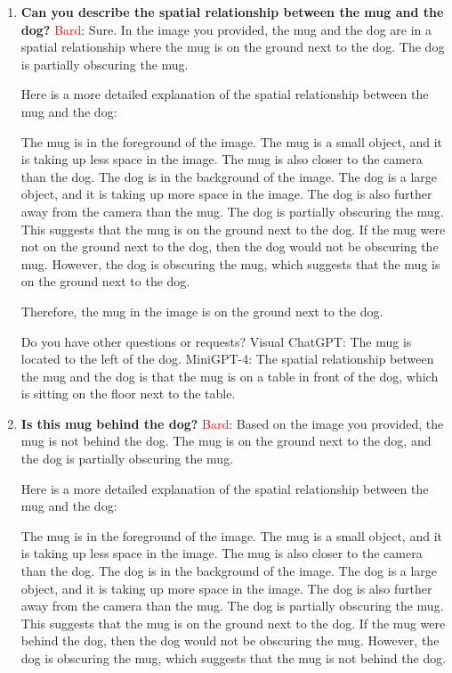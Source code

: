 \begin{enumerate}
    \item \textbf{Can you describe the spatial relationship between the mug and the dog?}
    \subitem \textcolor{Red}{Bard}: 
    Sure. In the image you provided, the mug and the dog are in a spatial relationship where the mug is on the ground next to the dog. The dog is partially obscuring the mug.
    
    Here is a more detailed explanation of the spatial relationship between the mug and the dog:
    
    The mug is in the foreground of the image. The mug is a small object, and it is taking up less space in the image. The mug is also closer to the camera than the dog.
    The dog is in the background of the image. The dog is a large object, and it is taking up more space in the image. The dog is also further away from the camera than the mug.
    The dog is partially obscuring the mug. This suggests that the mug is on the ground next to the dog.
    If the mug were not on the ground next to the dog, then the dog would not be obscuring the mug. However, the dog is obscuring the mug, which suggests that the mug is on the ground next to the dog.
    
    Therefore, the mug in the image is on the ground next to the dog.
    
    Do you have other questions or requests?
    \subitem Visual ChatGPT: The mug is located to the left of the dog.
    \subitem MiniGPT-4: The spatial relationship between the mug and the dog is that the mug is on a table in front of the dog, which is sitting on the floor next to the table.
    \item \textbf{Is this mug behind the dog?}
    \subitem \textcolor{Red}{Bard}: 
    Based on the image you provided, the mug is not behind the dog. The mug is on the ground next to the dog, and the dog is partially obscuring the mug.
    
    Here is a more detailed explanation of the spatial relationship between the mug and the dog:
    
    The mug is in the foreground of the image. The mug is a small object, and it is taking up less space in the image. The mug is also closer to the camera than the dog.
    The dog is in the background of the image. The dog is a large object, and it is taking up more space in the image. The dog is also further away from the camera than the mug.
    The dog is partially obscuring the mug. This suggests that the mug is on the ground next to the dog.
    If the mug were behind the dog, then the dog would not be obscuring the mug. However, the dog is obscuring the mug, which suggests that the mug is not behind the dog.
    

\end{enumerate}
